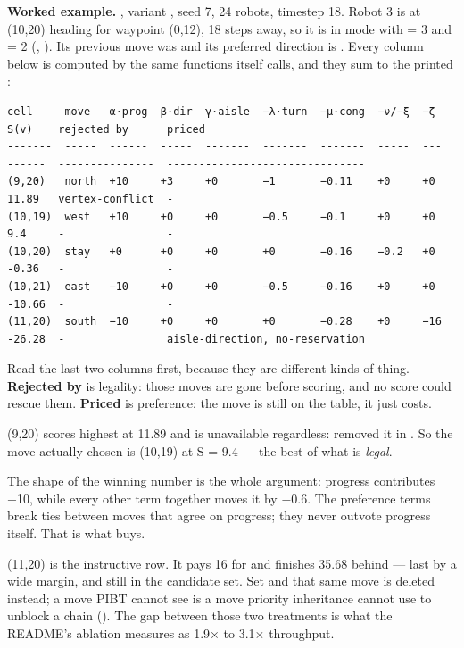 \begin{workedexample}
\textbf{Worked example.} , variant , seed 7, 24 robots, timestep 18. Robot 3 is at (10,20) heading for waypoint (0,12), 18 steps away, so it is in  mode with  = 3 and  = 2 (, ). Its previous move was  and its preferred direction is . Every column below is computed by the same functions  itself calls, and they sum to the printed :

{\fontsize{5.6}{6.7}\selectfont
\begin{verbatim}
cell     move   α·prog  β·dir  γ·aisle  −λ·turn  −μ·cong  −ν/−ξ  −ζ   S(v)    rejected by      priced
-------  -----  ------  -----  -------  -------  -------  -----  ---  ------  ---------------  -------------------------------
(9,20)   north  +10     +3     +0       −1       −0.11    +0     +0   11.89   vertex-conflict  -
(10,19)  west   +10     +0     +0       −0.5     −0.1     +0     +0   9.4     -                -
(10,20)  stay   +0      +0     +0       +0       −0.16    −0.2   +0   -0.36   -                -
(10,21)  east   −10     +0     +0       −0.5     −0.16    +0     +0   -10.66  -                -
(11,20)  south  −10     +0     +0       +0       −0.28    +0     −16  -26.28  -                aisle-direction, no-reservation
\end{verbatim}
}

Read the last two columns first, because they are different kinds of thing. \textbf{Rejected by} is legality: those moves are gone before scoring, and no score could rescue them. \textbf{Priced} is preference: the move is still on the table, it just costs.

(9,20) scores highest at 11.89 and is unavailable regardless:  removed it in . So the move actually chosen is (10,19) at S = 9.4 — the best of what is \emph{legal}.

The shape of the winning number is the whole argument: progress contributes +10, while every other term together moves it by −0.6. The preference terms break ties between moves that agree on progress; they never outvote progress itself. That is what  buys.

(11,20) is the instructive row. It pays 16 for  and finishes 35.68 behind — last by a wide margin, and still in the candidate set. Set  and that same move is deleted instead; a move PIBT cannot see is a move priority inheritance cannot use to unblock a chain (). The gap between those two treatments is what the README's ablation measures as 1.9× to 3.1× throughput.
\end{workedexample}

